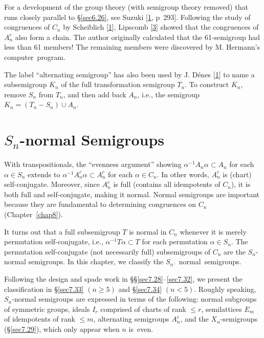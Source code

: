\documentclass{surv-l}
\numberwithin{equation}{section}
\numberwithin{table}{section}
\numberwithin{figure}{section}
\theoremstyle{definition}
\begin{document}
For a development of the group theory (with semigroup theory
removed) that runs closely parallel to \S\ref{sec6.26}, see
Suzuki [\hyperlink{bib74}{1}, p~293].
Following the study of congruences of $C_{n}$ by
Scheiblich
[\hyperlink{bib68}{1}], Lipscomb
[\hyperlink{bib43b}{3}] showed that the congruences of
$A_{n}^{c}$ also form a chain. The author originally calculated
that the 61-semigroup had less than 61 members! The remaining
members were discovered by M. Hermann's
computer~program.

The label ``alternating semigroup'' has also been used by J.
D\'{e}nes [\hyperlink{bib11}{1}] to name a subsemigroup
$K_{n}$ of the full transformation semigroup $T_{n}$. To construct
$K_{n}$, remove $S_{n}$ from $T_{n}$, and then add back $A_{n}$,
i.e., the semigroup $K_{n}=(T_{n}-S_{n})\cup A_{n}$.

\chapter{$S_{n}$-normal Semigroups}\label{chap7}

With transpositionals, the ``evenness argument'' showing
$\alpha^{-1}A_{n}\alpha\subset A_{n}$ for each $\alpha\in S_{n}$
extends to $\alpha^{-1}A_{n}^{c}\alpha\subset A_{n}^{c}$ for each
$\alpha\in C_{n}$. In other words, $A_{n}^{c}$ is (chart)
self-conjugate. Moreover, since $A_{n}^{c}$ is full (contains all
idempotents of $C_{n}$), it is both full and self-conjugate,
making it normal. Normal semigroups are important because they are
fundamental to determining congruences on $C_{n}$
(Chapter~\ref{chap8}).

It turns out that a full subsemigroup $T$ is normal in $C_{n}$
whenever it is merely permutation self-conjugate, i.e.,
$\alpha^{-1}T\alpha\subset T$ for each permutation $\alpha\in
S_{n}$. The permutation self-conjugate (not necessarily full)
subsemigroups of $C_{n}$ are the $S_{n}$-normal semigroups. In
this chapter, we classify the $S_{n^{-}}$ normal~semigroups.

Following the design and spade work in
\S\S\ref{sec7.28}--\ref{sec7.32}, we present the classification in
\S\ref{sec7.33} $(n\geq 5)$ and \S\ref{sec7.34} $(n<5)$. Roughly
speaking, $S_{n}$-normal semigroups are expressed in terms of the
following: normal subgroups of symmetric groups, ideals $I_{r}$
comprised of charts of rank $\leq r$, semilattices $E_{m}$ of
idempotents of rank $\leq m$, alternating semigroups $A_{n}^{c}$,
and the $X_{n}$-semigroups (\S\ref{sec7.29}), which only
appear when $n$ is~even.
\end{document}
